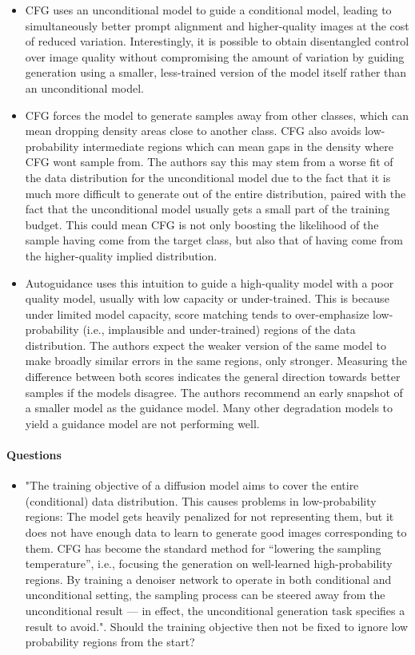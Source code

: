 \documentclass{article}
\begin{document}
\begin{itemize}
    \item CFG uses an unconditional model to guide a conditional model, leading to simultaneously better prompt alignment and higher-quality images at the cost of reduced variation. Interestingly, it is possible to obtain disentangled control over image quality without compromising the amount of variation by guiding generation using a smaller, less-trained version of the model itself rather than an unconditional model.
    \item CFG forces the model to generate samples away from other classes, which can mean dropping density areas close to another class. CFG also avoids low-probability intermediate regions which can mean gaps in the density where CFG wont sample from. The authors say this may stem from a worse fit of the data distribution for the unconditional model due to the fact that it is much more difficult to generate out of the entire distribution, paired with the fact that the unconditional model usually gets a small part of the training budget. This could mean CFG is not only boosting the likelihood of the sample having come from the target class, but also that of having come from the higher-quality implied distribution.
    \item Autoguidance uses this intuition to guide a high-quality model with a poor quality model, usually with low capacity or under-trained. This is because under limited model capacity, score matching tends to over-emphasize low-probability (i.e., implausible and under-trained) regions of the data distribution. The authors expect the weaker version of the same model to make broadly similar errors in the same regions, only stronger. Measuring the difference between both scores indicates the general direction towards better samples if the models disagree. The authors recommend an early snapshot of a smaller model as the guidance model. Many other degradation models to yield a guidance model are not performing well.
\end{itemize}

\paragraph{Questions}
\begin{itemize}
    \item "The training objective of a diffusion model aims to cover the entire (conditional) data distribution. This causes problems in low-probability regions: The model gets heavily penalized for not representing them, but it does not have enough data to learn to generate good images corresponding to them. CFG has become the standard method for “lowering the sampling temperature”, i.e., focusing the generation on well-learned high-probability regions. By training a denoiser network to operate in both conditional and unconditional setting, the sampling process can be steered away from the unconditional result — in effect, the unconditional generation task specifies a result to avoid.". Should the training objective then not be fixed to ignore low probability regions from the start?
\end{itemize}
 
\end{document}
